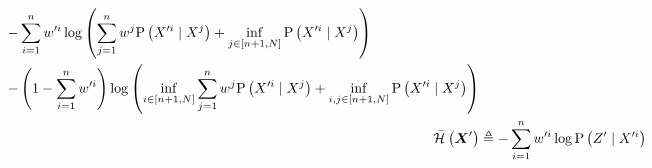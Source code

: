 \begin{lemmaE}
\begin{small}
\begin{subequations}
\begin{align}
\begin{split}
				&\phantomeq-\sum_{i=1}^n\weight{}{\prime i}\log\left(\sum_{j=1}^n\weight{}{j}\probcond{\states{}^{\prime i}}{\states{}^j}+\inf_{j\in[n+1,N]}\probcond{\states{}^{\prime i}}{\states{}^j}\right)\\
				& \phantomeq-\left(1-\sum_{i=1}^n\weight{}{\prime i}\right)\log\left(\inf_{i\in[n+1,N]}\sum_{j=1}^n\weight{}{j}\probcond{\states{}^{\prime i}}{\states{}^j}+\inf_{i,j\in[n+1,N]}\probcond{\states{}^{\prime i}}{\states{}^j}\right)
			\end{split}\\
			\simplentropy{\statesRV{}^\prime}{} & \triangleq-\sum_{i=1}^n\weight{}{\prime i}\log\probcond{\observations{}^\prime}{\states{}^{\prime i}}
		\end{align}
	\end{subequations}
	\end{small}
\end{lemmaE}
